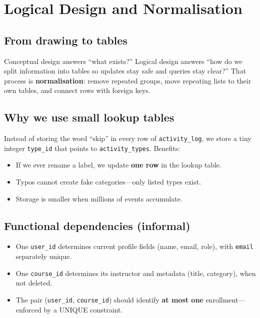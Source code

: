 
\chapter{Logical Design and Normalisation}
\label{ch:logical}

\section{From drawing to tables}
Conceptual design answers ``what exists?'' Logical design answers ``how do we split information into tables so updates stay safe and queries stay clear?'' That process is \textbf{normalisation}: remove repeated groups, move repeating lists to their own tables, and connect rows with foreign keys.

\section{Why we use small lookup tables}
Instead of storing the word ``skip'' in every row of \texttt{activity\_log}, we store a tiny integer \texttt{type\_id} that points to \texttt{activity\_types}. Benefits:

\begin{itemize}[leftmargin=*]
  \item If we ever rename a label, we update \textbf{one row} in the lookup table.
  \item Typos cannot create fake categories---only listed types exist.
  \item Storage is smaller when millions of events accumulate.
\end{itemize}

\section{Functional dependencies (informal)}
\begin{itemize}[leftmargin=*]
  \item One \texttt{user\_id} determines current profile fields (name, email, role), with \texttt{email} separately unique.
  \item One \texttt{course\_id} determines its instructor and metadata (title, category), when not deleted.
  \item The pair (\texttt{user\_id}, \texttt{course\_id}) should identify \textbf{at most one} enrollment---enforced by a UNIQUE constraint.
\end{itemize}

